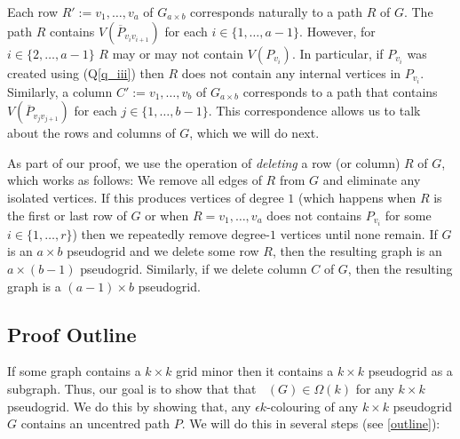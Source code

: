 \documentclass{patmorin}
\newcommand{\defin}[1]{\emph{\color{brown}#1}}
\DeclareMathOperator{\chilin}{\chi_{\mathrm{lin}}}
\begin{document}

Each row $R':=v_1,\ldots,v_a$ of $G_{a\times b}$ corresponds naturally to a path $R$ of $G$. The path $R$ contains $V(\overline{P}_{v_iv_{i+1}})$ for each $i\in\{1,\ldots,a-1\}$.  However, for $i\in\{2,\ldots,a-1\}$ $R$ may or may not contain $V(P_{v_i})$.  In particular, if $P_{v_i}$ was created using (Q\ref{q_iii}) then $R$ does not contain any internal vertices in $P_{v_i}$. Similarly, a column $C':=v_1,\ldots,v_b$ of $G_{a\times b}$ corresponds to a path that contains $V(\overline{P}_{v_jv_{j+1}})$ for each $j\in\{1,\ldots,b-1\}$. This correspondence allows us to talk about the rows and columns of $G$, which we will do next.

As part of our proof, we use the operation of \defin{deleting} a row (or column) $R$ of $G$, which works as follows:  We remove all edges of $R$ from $G$ and eliminate any isolated vertices.  If this produces vertices of degree $1$ (which happens when $R$ is the first or last row of $G$ or when $R=v_1,\ldots,v_a$ does not contains $P_{v_i}$ for some $i\in\{1,\ldots,r\}$) then we repeatedly remove degree-$1$ vertices until none remain.  If $G$ is an $a\times b$ pseudogrid and we delete some row $R$, then the resulting graph is an $a\times (b-1)$ pseudogrid.  Similarly, if we delete column $C$ of $G$, then the resulting graph is a $(a-1)\times b$ pseudogrid.

\subsection{Proof Outline}

If some graph contains a $k\times k$ grid minor then it contains a $k\times k$ pseudogrid as a subgraph.  Thus, our goal is to show that that $\chilin(G)\in \Omega(k)$ for any $k\times k$ pseudogrid.  We do this by showing that, any $\epsilon k$-colouring of any $k\times k$ pseudogrid $G$ contains an uncentred path $P$. We will do this in several steps (see \cref{outline}):
\end{document}

